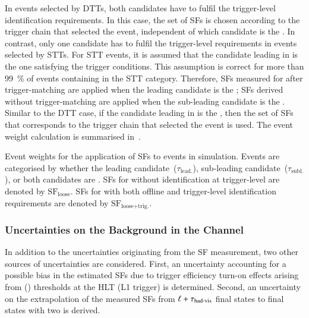 In events selected by DTTs, both \tauhadvis candidates have to fulfil the
trigger-level identification requirements. In this case, the set of SFs is chosen
according to the trigger chain that selected the event, independent of which
\tauhadvis candidate is the \faketauhadvis. In contrast, only one \tauhadvis
candidate has to fulfil the trigger-level requirements in events selected by
STTs. For STT events, it is assumed that the \tauhadvis candidate leading in \pT
is the one satisfying the trigger conditions. This assumption is correct for
more than \SI{99}{\percent} of \ttbar events containing \faketauhadvis in the STT
category. Therefore, SFs measured for \faketauhadvis after trigger-matching are
applied when the leading \tauhadvis candidate is the \faketauhadvis; SFs derived
without trigger-matching are applied when the sub-leading \tauhadvis candidate
is the \faketauhadvis. Similar to the DTT case, if the \tauhadvis candidate
leading in \pT is the \faketauhadvis, then the set of SFs that corresponds to
the trigger chain that selected the event is used. The event weight calculation
is summarised in~.

\begin{table}[htbp]
  \centering

  \caption[Event weights for the application of SFs to \ttbarFakes events in
  simulation.]{Event weights for the application of SFs to \ttbarFakes events in
    simulation. Events are categorised by whether the leading \tauhadvis
    candidate~($\tau_{\text{lead.}}$), sub-leading \tauhadvis
    candidate~($\tau_{\text{subl.}}$), or both \tauhadvis candidates are
    \faketauhadvis. SFs for \faketauhadvis without identification at
    trigger-level are denoted by $\text{SF}_{\text{loose}}$. SFs for
    \faketauhadvis with both offline and trigger-level identification
    requirements are denoted by $\text{SF}_\text{loose+trig.}$.}%
  \label{tab:ttbarSF_application_rule}

  \resizebox{\textwidth}{!}{
    
  }
\end{table}


\subsubsection{Uncertainties on the \ttbarFakes Background in the \hadhad
  Channel}

In addition to the uncertainties originating from the SF measurement, two other
sources of uncertainties are considered. First, an uncertainty accounting for a
possible bias in the estimated SFs due to trigger efficiency turn-on effects
arising from \tauhadvis \pT (\ET) thresholds at the HLT (L1 trigger) is
determined. Second, an uncertainty on the extrapolation of the measured SFs from
$\ell + \tau_{\text{had-vis}}$ final states to final states with two \tauhadvis is derived.

